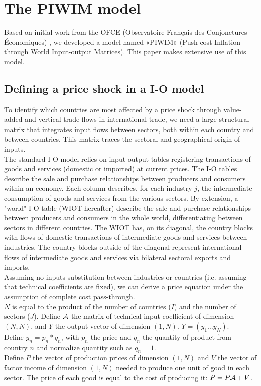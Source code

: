 \documentclass[11pt,a4paper]{article}
\begin{document}
\section{The PIWIM model }
\label{sec:metho}
Based on initial work from the OFCE (Observatoire Français des Conjonctures Économiques) \cite{Cochard2016}, we developed a model named «PIWIM» (Push cost Inflation through World Input-output Matrices). This paper makes extensive use of this model.



\subsection{Defining a price shock in a I-O model}
\label{subsec:ioprice}
To identify which countries are most affected by a price shock through value-added and vertical trade flows in international trade, we need a large structural matrix that integrates input flows between sectors, both within each country and between countries.
This matrix traces the sectoral and geographical origin of inputs. \\
The standard I-O model relies on input-output tables registering transactions of goods and services (domestic or imported) at current prices. The I-O tables describe the sale and purchase relationships between producers and consumers within an economy. Each column describes, for each industry $j$, the intermediate consumption of goods and services from the various sectors.
By extension, a "world" I-O table (WIOT hereafter) describe the sale and purchase relationships between producers and consumers in the whole world, differentiating between sectors in different countries.
The WIOT has, on its diagonal, the country blocks with flows of domestic transactions of intermediate goods and services between industries.
The country blocks outside of the diagonal represent international flows of intermediate goods and services via bilateral sectoral exports and imports. \\
Assuming no inputs substitution between industries or countries (i.e. assuming that technical coefficients are fixed), we can derive a price equation under the assumption of complete cost pass-through.\\
$N$ is equal to the product of the number of countries ($I$) and the number of sectors ($J$). Define $\cal A$ the matrix of technical input coefficient of dimension $(N, N)$, and $Y$ the output vector of dimension $(1, N)$. $Y=(y_1\ldots y_N)$.  \\
Define $y_n=p_n*q_n$, with $p_n$ the price and $q_n$ the quantity of product from country $n$ and normalize quantity such as $q_n=1$. \\
Define $P$ the vector of production prices of dimension $(1, N)$ and $V$ the vector of factor income of dimension $(1, N)$ needed to produce one unit of good in each sector. The price of each good is equal to the cost of producing it: $P=P{\cal A}+V$. \\
\end{document}
